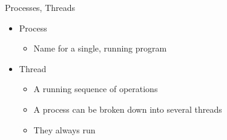 \begin{frame}
 {
\begin{alertblock}{Processes, Threads}
	\begin{itemize}
		\item Process
		\begin{itemize}
			\item Name for a single, running program
		\end{itemize}
		\item Thread
		\begin{itemize}
			\item A running sequence of operations 
			\item A process can be broken down into several threads
			\item They always run 
		\end{itemize}
	\end{itemize}
\end{alertblock}
}

\end{frame}